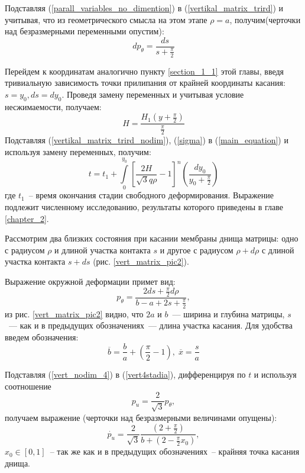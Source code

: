 Подставляя (\ref{parall_variables_no_dimention}) в (\ref{vertikal_matrix_trird}) и учитывая, что из геометрического смысла на этом этапе $\rho = a$, получим(черточки над безразмерными переменными опустим):
	\begin{equation}
	dp_\theta = \dfrac{ds}{s+\frac{\pi}{2}}
	\label{vertikal_matrix_trird_nodim}
	\end{equation}

Перейдем к координатам аналогично пункту \ref{section_1_1} этой главы, введя тривиальную зависимость точки прилипания от крайней координаты касания: $s=y_0, ds = dy_0$.
Проведя замену переменных и учитывая условие несжимаемости, получаем:
	\begin{equation}
	H=\dfrac{H_1(y+\frac{\pi}{2})}{\frac{\pi}{2}}
	\end{equation}
Подставляя (\ref{vertikal_matrix_trird_nodim}), (\ref{sigma}) в (\ref{main_equation}) и используя замену переменных, получим:
\begin{equation}
t = t_1 + \int\limits_0^{y_0}\left[ \dfrac{2H}{\sqrt3 q \rho} -1\right]^n\left(\dfrac{dy_0}{y_0+\frac{\pi}{2}}\right)
\end{equation}
	где $t_1$~-- время окончания стадии свободного деформирования.   
Выражение подлежит численному исследованию, результаты которого приведены в главе \ref{chapter_2}.
	

	
	Рассмотрим два близких состояния при касании мембраны днища матрицы:
	одно  с радиусом $\rho$ и длиной участка контакта $s$ и другое с радиусом $\rho+d\rho$ с длиной участка контакта $s+ds$ (рис. \ref{vert_matrix_pic2}).
	
	Выражение окружной деформации примет вид:
	\begin{equation}
	p_\theta = \dfrac{2ds+\frac{\pi}{2}d\rho}{b-a+2s+\frac{\pi}{2}},
	\label{vert4stadia}
	\end{equation}
   из рис. \ref{vert_matrix_pic2} видно, что $2a$ и $b$~--- ширина и глубина матрицы, $s$~--- как и в предыдущих обозначениях~--- длина участка касания. Для удобства введем обозначения:
   \begin{equation}
   \overline{b} = \dfrac{b}{a}+\left(\dfrac \pi 2 -1\right),\; \overline{x} = \dfrac{s}{a}
	\label{vert_nodim_4}
   \end{equation}
	   
	
    Подставляя (\ref{vert_nodim_4}) в (\ref{vert4stadia}), дифференцируя по $t$ 
    и используя соотношение 
    \begin{equation} 
    p_u=\frac{2}{\sqrt 3}p_\theta,
	\end{equation}
     получаем выражение (черточки над безразмерными величинами опущены):
    \begin{equation}
    \dot{p_u} = \dfrac{2}{\sqrt 3}\dfrac{\left( 2+\frac{\pi}{2}\right)}{b+\left(2-\frac{\pi}{2}x_0\right)},
    \label{vert_nodim}
    \end{equation}
	$x_0 \in [0, 1]$~-- так же как и в предыдущих обозначениях~-- крайняя точка касания днища.
	
